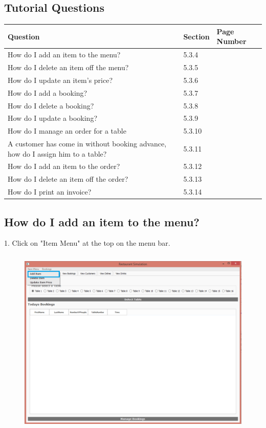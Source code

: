 \subsection{Tutorial Questions}

\begin{center}
\begin{tabular}{|p{8cm}|p{2cm}|p{2cm}|}
    \hline
    \textbf{Question} & \textbf{Section} & \textbf{Page Number} \\ \hline
 How do I add an item to the menu? & 5.3.4 & \\ \hline
How do I delete an item off the menu? & 5.3.5 & \\ \hline
 How do I update an item's price?& 5.3.6 & \\ \hline
 How do I add a booking? & 5.3.7 & \\ \hline
 How do I delete a booking? & 5.3.8 & \\ \hline
 How do I update a booking? & 5.3.9 & \\ \hline
How do I manage an order for a table & 5.3.10 & \\ \hline
 A customer has come in without booking advance, how do I assign him to a table? & 5.3.11 & \\ \hline
How do I add an item to the order? & 5.3.12& \\ \hline
 How do I delete an item off the order? & 5.3.13 & \\ \hline
 How do I print an invoice? & 5.3.14& \\ 

    \hline
\end{tabular}
\end{center}

\subsection{How do I add an item to the menu?}

1. Click on "Item Menu" at the top on the menu bar.
\begin{figure}[H]
    \includegraphics[height = 9cm]{./Manual/images/AddItem1} 
    \caption{} \label{fig:additem1}
\end{figure}

